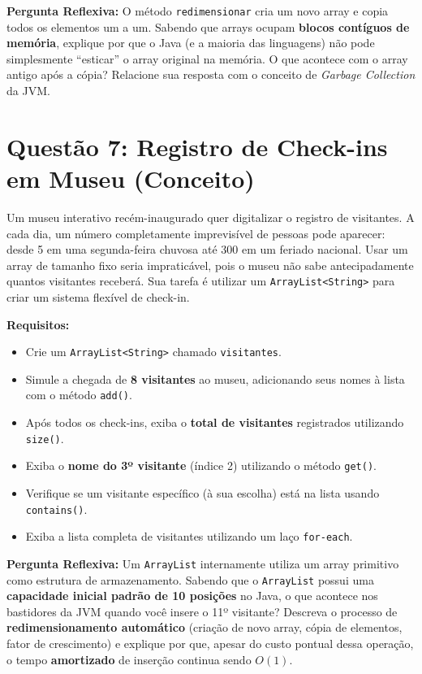 \documentclass[12pt, a4paper]{article}
\begin{document}
\textbf{Pergunta Reflexiva:} O método \texttt{redimensionar} cria um novo array e copia todos os elementos um a um. Sabendo que arrays ocupam \textbf{blocos contíguos de memória}, explique por que o Java (e a maioria das linguagens) não pode simplesmente ``esticar'' o array original na memória. O que acontece com o array antigo após a cópia? Relacione sua resposta com o conceito de \textit{Garbage Collection} da JVM.


\section*{Questão 7: Registro de Check-ins em Museu (Conceito)}
Um museu interativo recém-inaugurado quer digitalizar o registro de visitantes. A cada dia, um número completamente imprevisível de pessoas pode aparecer: desde 5 em uma segunda-feira chuvosa até 300 em um feriado nacional. Usar um array de tamanho fixo seria impraticável, pois o museu não sabe antecipadamente quantos visitantes receberá. Sua tarefa é utilizar um \texttt{ArrayList<String>} para criar um sistema flexível de check-in.

\textbf{Requisitos:}
\begin{itemize}
    \item Crie um \texttt{ArrayList<String>} chamado \texttt{visitantes}.
    \item Simule a chegada de \textbf{8 visitantes} ao museu, adicionando seus nomes à lista com o método \texttt{add()}.
    \item Após todos os check-ins, exiba o \textbf{total de visitantes} registrados utilizando \texttt{size()}.
    \item Exiba o \textbf{nome do 3º visitante} (índice 2) utilizando o método \texttt{get()}.
    \item Verifique se um visitante específico (à sua escolha) está na lista usando \texttt{contains()}.
    \item Exiba a lista completa de visitantes utilizando um laço \texttt{for-each}.
\end{itemize}

\textbf{Pergunta Reflexiva:} Um \texttt{ArrayList} internamente utiliza um array primitivo como estrutura de armazenamento. Sabendo que o \texttt{ArrayList} possui uma \textbf{capacidade inicial padrão de 10 posições} no Java, o que acontece nos bastidores da JVM quando você insere o 11º visitante? Descreva o processo de \textbf{redimensionamento automático} (criação de novo array, cópia de elementos, fator de crescimento) e explique por que, apesar do custo pontual dessa operação, o tempo \textbf{amortizado} de inserção continua sendo $O(1)$.
\end{document}
